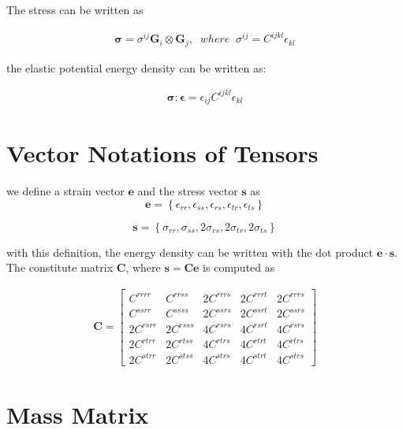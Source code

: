 \documentclass{article}
\begin{document}
The stress can be written as

\begin{eqnarray}
\boldsymbol{\sigma} = \sigma^{ij}\mathbf{G}_i\otimes\mathbf{G}_j,\;\;where\;\;
\sigma^{ij} = C^{ijkl}\epsilon_{kl}
\end{eqnarray}

the elastic potential energy density can be written as:

\begin{eqnarray}
\boldsymbol{\sigma}:\boldsymbol{\epsilon} = \epsilon_{ij} C^{ijkl}\epsilon_{kl}
\end{eqnarray}


\section{Vector Notations of Tensors}

we define a strain vector $\mathbf{e}$ and the stress vector $\mathbf{s}$ as
\begin{equation}
\mathbf{e} = \left\{
\epsilon_{rr},
\epsilon_{ss},
\epsilon_{rs},
\epsilon_{tr},
\epsilon_{ts}
\right\} 
\end{equation}


\begin{equation}
\mathbf{s} = \left\{
\sigma_{rr},
\sigma_{ss},
2\sigma_{rs},
2\sigma_{tr},
2\sigma_{ts}
\right\} 
\end{equation}

with this definition, the energy density can be written with the dot product $\mathbf{e}\cdot\mathbf{s}$.
%
The constitute matrix $\mathbf{C}$, where $\mathbf{s}=\mathbf{C}\mathbf{e}$ is computed as

\begin{eqnarray}
\mathbf{C} = 
\left[\begin{array}{ccccc}
    C^{rrrr} & C^{rrss} & 2C^{rrrs} & 2C^{rrrt} & 2C^{rrrs}\\
    C^{ssrr} & C^{ssss} & 2C^{ssrs} & 2C^{ssrt} & 2C^{ssrs}\\
    2C^{rsrr} & 2C^{rsss} & 4C^{rsrs} & 4C^{rsrt} & 4C^{rsrs}\\    
    2C^{rtrr} & 2C^{rtss} & 4C^{rtrs} & 4C^{rtrt} & 4C^{rtrs}\\        
    2C^{strr} & 2C^{stss} & 4C^{strs} & 4C^{strt} & 4C^{strs}
\end{array}\right]
\end{eqnarray}


\section{Mass Matrix}
\end{document}
